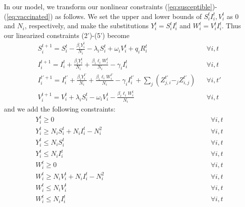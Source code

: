 \documentclass{article}
\begin{document}
In our model, we transform our nonlinear constraints (\ref{eq:susceptible})-(\ref{eq:vaccinated}) as follows. We set the upper and lower bounds of $S_i^t I_i^t, V_i^t$ as $0$ and $N_i$, respectively, and make the substitutions $ Y_i^t = S_i^t I_i^t $ and $ W_i^t = V_i^t I_i^t $. Thus our linearized constraints (2')-(5') become
\begin{align}
    &S_i^{t+1} = S_i^t - \frac{\beta_i Y_i^t}{N_i} - \lambda_i S_i^t + \omega_i V_i^t + q_i R_i^t && \forall i, t \tag{2'} \label{eq:linearized_susceptible} \\
    &I_i^{t+1} = I_i^t + \frac{\beta_i Y_i^t}{N_i} + \frac{\beta_i \ell_i W_i^t}{N_i} - \gamma_i I_i^t && \forall i, t \tag{3'} \label{eq:linearized_infected} \\
    &I_i^{t'+1} = I_i^{t'} + \frac{\beta_i Y_i^{t'}}{N_i} + \frac{\beta_i \ell_i W_i^{t'}}{N_i} - \gamma_i I_i^{t'} + \sum_j (Z_{j,i}^{t'} - _j Z_{i,j}^{t'}) && \forall i, t' \tag{4'} \label{eq:linearized_infected_transfer} \\
    &V_i^{t+1} = V_i^t + \lambda_i S_i^t - \omega_i V_i^t - \frac{\beta_i \ell_i W_i^t}{N_i} && \forall i, t \tag{5'} \label{eq:linearized_vaccinated}
\end{align}
and we add the following constraints:
\begin{align}
    &Y_i^t \geq 0 && \forall i, t \tag{22} \label{eq:Y_nonnegativity} \\
    &Y_i^t \geq N_i S_i^t + N_i I_i^t - N_i^2 && \forall i, t \tag{23} \label{eq:Y_lower_bound} \\
    &Y_i^t \leq N_i S_i^t && \forall i, t \tag{24} \label{eq:Y_upper_bound_S} \\
    &Y_i^t \leq N_i I_i^t && \forall i, t \tag{25} \label{eq:Y_upper_bound_I} \\
    &W_i^t \geq 0 && \forall i, t \tag{26} \label{eq:W_nonnegativity} \\
    &W_i^t \geq N_i V_i^t + N_i I_i^t - N_i^2 \quad \quad \quad \quad \quad \quad \quad \quad \quad \quad \quad \quad \quad \quad && \forall i, t \tag{27} \label{eq:W_lower_bound} \\
    &W_i^t \leq N_i V_i^t && \forall i, t \tag{28} \label{eq:W_upper_bound_X} \\
    &W_i^t \leq N_i I_i^t && \forall i, t \tag{29} \label{eq:W_upper_bound_I}
\end{align}
\end{document}
